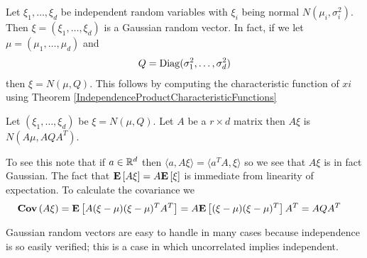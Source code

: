 \begin{examp}\label{IndependentGaussiansAreJointlyGaussian}Let $\xi_1, \dots, \xi_d$ be independent random variables
  with $\xi_i$ being normal $N(\mu_i, \sigma_i^2)$.  Then $\xi =
  (\xi_1, \dots, \xi_d)$ is a Gaussian random vector.  In fact, if we
  let $\mu = (\mu_1, \dots, \mu_d)$ and 
\begin{align*}
Q = \operatorname*{Diag}(\sigma_1^2, \dots, \sigma_d^2)
\end{align*}
then $\xi = N(\mu, Q)$.  This follows by computing the characteristic
function of $xi$ using Theorem \ref{IndependenceProductCharacteristicFunctions}
\end{examp}

\begin{examp}\label{LinearTransformationGaussian}Let $(\xi_1, \dots, \xi_d)$ be $\xi = N(\mu, Q)$.  Let
  $A$ be a $r \times d$ matrix then $A \xi$ is $N( A \mu, A Q
  A^T)$.

To see this note that if $a \in \mathbb{R}^d$ then $\langle a , A \xi
\rangle = \langle a^T A, \xi \rangle$ so we see that $A \xi$ is in
fact Gaussian.  The fact that $\textbf{E}\left[A \xi\right] =
A\textbf{E}\left[\xi\right]$ is immediate from linearity of expectation.  To
calculate the covariance we 
\begin{align*}
\textbf{Cov} \left (A\xi \right ) &= \textbf{E}\left[A(\xi - \mu) (\xi - \mu)^T A^T\right] =
A\textbf{E}\left[(\xi - \mu) (\xi - \mu)^T\right]A^T = 
A Q A^T
\end{align*}
\end{examp}

Gaussian random vectors are easy to handle in many cases because
independence is so easily verified; this is a case in which
uncorrelated implies independent.

